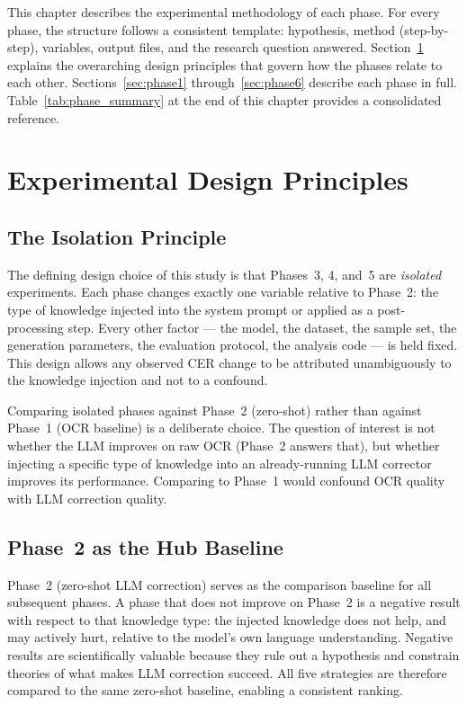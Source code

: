 \setlength{\parskip}{0.5\baselineskip}

This chapter describes the experimental methodology of each phase.
For every phase, the structure follows a consistent template: hypothesis,
method (step-by-step), variables, output files, and the research question
answered.
Section~\ref{sec:design} explains the overarching design principles that
govern how the phases relate to each other.
Sections~\ref{sec:phase1} through~\ref{sec:phase6} describe each phase in
full. Table~\ref{tab:phase_summary} at the end of this chapter provides a
consolidated reference.

\section{Experimental Design Principles}
\label{sec:design}

\subsection{The Isolation Principle}
\label{subsec:isolation}

The defining design choice of this study is that Phases~3, 4, and~5 are
\emph{isolated} experiments. Each phase changes exactly one variable relative
to Phase~2: the type of knowledge injected into the system prompt or applied
as a post-processing step. Every other factor --- the model, the dataset,
the sample set, the generation parameters, the evaluation protocol, the
analysis code --- is held fixed. This design allows any observed CER change
to be attributed unambiguously to the knowledge injection and not to a
confound.

Comparing isolated phases against Phase~2 (zero-shot) rather than against
Phase~1 (OCR baseline) is a deliberate choice. The question of interest is
not whether the LLM improves on raw OCR (Phase~2 answers that), but whether
injecting a specific type of knowledge into an already-running LLM corrector
improves its performance. Comparing to Phase~1 would confound OCR quality
with LLM correction quality.

\subsection{Phase~2 as the Hub Baseline}
\label{subsec:hub}

Phase~2 (zero-shot LLM correction) serves as the comparison baseline for all
subsequent phases. A phase that does not improve on Phase~2 is a negative
result with respect to that knowledge type: the injected knowledge does not
help, and may actively hurt, relative to the model's own language
understanding. Negative results are scientifically valuable because they
rule out a hypothesis and constrain theories of what makes LLM correction
succeed. All five strategies are therefore compared to the same zero-shot
baseline, enabling a consistent ranking.

